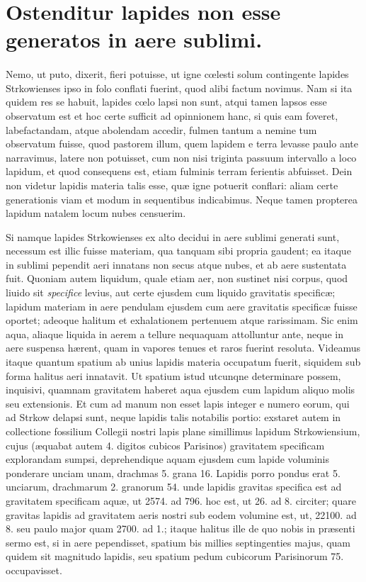 \documentclass[a4paper, 11pt, oneside, polutonikogreek, latin]{article}
\begin{document}
\section{Ostenditur lapides non esse generatos in aere sublimi.}
\paragraph{}
Nemo, ut puto, dixerit, fieri potuisse, ut igne cœlesti solum contingente lapides Strkowienses ipso in folo conflati fuerint, quod alibi factum novimus. Nam si ita quidem res se habuit, lapides cœlo lapsi non sunt, atqui tamen lapsos esse observatum est et hoc certe sufficit ad opinnionem hanc, si quis eam foveret, labefactandam, atque abolendam accedir, fulmen tantum a nemine tum observatum fuisse, quod pastorem illum, quem lapidem e terra levasse paulo ante narravimus, latere non potuisset, cum non nisi triginta passuum intervallo a loco lapidum, et quod consequens est, etiam fulminis terram ferientis abfuisset. Dein non videtur lapidis materia talis esse, quæ igne potuerit conflari: aliam certe generationis viam et modum in sequentibus indicabimus. Neque tamen propterea lapidum natalem locum nubes censuerim.

Si namque lapides Strkowienses ex alto decidui in aere sublimi generati sunt, necessum est illic fuisse materiam, qua tanquam sibi propria gaudent; ea itaque in sublimi pependit aeri innatans non secus atque nubes, et ab aere sustentata fuit. Quoniam autem liquidum, quale etiam aer, non sustinet nisi corpus, quod liuido sit \emph{specifice} levius, aut certe ejusdem cum liquido gravitatis specificæ; lapidum materiam in aere pendulam ejusdem cum aere gravitatis specificæ fuisse oportet; adeoque halitum et exhalationem pertenuem atque rarissimam. Sic enim aqua, aliaque liquida in aerem a tellure nequaquam attolluntur ante, neque in aere suspensa hærent, quam in vapores tenues et raros fuerint resoluta. Videamus itaque quantum spatium ab unius lapidis materia occupatum fuerit, siquidem sub forma halitus aeri innatavit. Ut spatium istud utcunqne determinare possem, inquisivi, quamnam gravitatem haberet aqua ejusdem cum lapidum aliquo molis seu extensionis. Et cum ad manum non esset lapis integer e numero eorum, qui ad Strkow delapsi sunt, neque lapidis talis notabilis portio: exstaret autem in collectione fossilium Collegii nostri lapis plane simillimus lapidum Strkowiensium, cujus (æquabat autem 4. digitos cubicos Parisinos) gravitatem specificam explorandam sumpsi, deprehendique aquam ejusdem cum lapide voluminis ponderare unciam unam, drachmas 5. grana 16. Lapidis porro pondus erat 5. unciarum, drachmarum 2. granorum 54. unde lapidis gravitas specifica est ad gravitatem specificam aquæ, ut 2574. ad 796. hoc est, ut 26. ad 8. circiter; quare gravitas lapidis ad gravitatem aeris nostri sub eodem volumine est, ut, 22100. ad 8. seu paulo major quam 2700. ad 1.; itaque halitus ille de quo nobis in præsenti sermo est, si in aere pependisset, spatium bis millies septingenties majus, quam quidem sit magnitudo lapidis, seu spatium pedum cubicorum Parisinorum 75. occupavisset.
\end{document}
